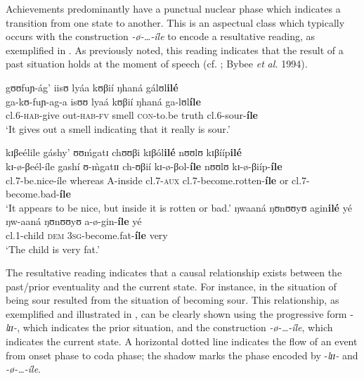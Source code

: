 \documentclass[output=paper,newtxmath,modfonts,nonflat,draftmode]{langsci/langscibook}
\begin{document}
Achievements predominantly have a punctual nuclear phase which indicates a transition from one state to another. This is an aspectual class which typically occurs with the construction \textit{-ø}\textit{-…-íle} to encode a resultative reading, as exemplified in . As previously noted, this reading indicates that the result of a past situation holds at the moment of speech (cf. \citealt{Comrie1976}; Bybee \textit{et} \textit{al.} 1994).

\ea \label{ex:kanijo:15}
\ea \glll gʊʊfuɲ-ág’ iisʊ   lyáa kʊβií ŋhaná gálʊl\textbf{ilé}\\
    ga-kʊ-fuɲ-ag-a isʊʊ  lyaá kʊβií ŋhaná  ga-lʊl\textbf{íle}\\
    cl.6-\textsc{hab}-give out-\textsc{hab}-\textsc{fv} smell \textsc{con}-to.be truth   cl.6-sour-\textbf{íle}\\
    \glt ‘It gives out a smell indicating that it really is sour.’

\ex 
    \glll   kɪβeélile       gáshy’      ʊʊḿgatɪ         chʊʊβi      kɪβól\textbf{ilé}  nʊʊlʊ kɪβííp\textbf{ilé}\\ 
            kɪ-ø-βeél-íle    gashí      ʊ-\`{m}gatɪɪ    ch-ʊβií     kɪ-ø-βol-\textbf{íle} nʊʊlʊ kɪ-ø-βiíp-\textbf{íle}\\       
            cl.7-be.nice-íle  whereas   A-inside        cl.7-\textsc{aux}    cl.7-become.rotten-\textbf{íle} or     cl.7-become.bad-\textbf{íle}\\
    \glt ‘It appears to be nice, but inside it is rotten or bad.’
\ex 
    \glll   ŋwaaná   ŋʊnʊʊyʊ    agin\textbf{ilé}  yé\\
            ŋw-aaná   ŋʊnʊʊyʊ   a-ø-gin-\textbf{íle}    yé\\
            cl.1-child \textsc{dem}         3\textsc{sg}-become.fat-\textbf{íle} very\\
    \glt ‘The child is very fat.’
\z
\z

The resultative reading indicates that a causal relationship exists between the past/prior eventuality and the current state. For instance, in  the situation of being sour resulted from the situation of becoming sour. This relationship, as exemplified and illustrated in , can be clearly shown using the progressive form -\textit{lɪɪ}\textit{-}, which indicates the prior situation, and the construction \textit{-ø}\textit{-\ldots-íle}, which indicates the current state. A horizontal dotted line indicates the flow of an event from onset phase to coda phase; the shadow marks the phase encoded by -\textit{lɪɪ}\textit{-} and \textit{-ø}\textit{-\ldots-íle}. 
\end{document}
